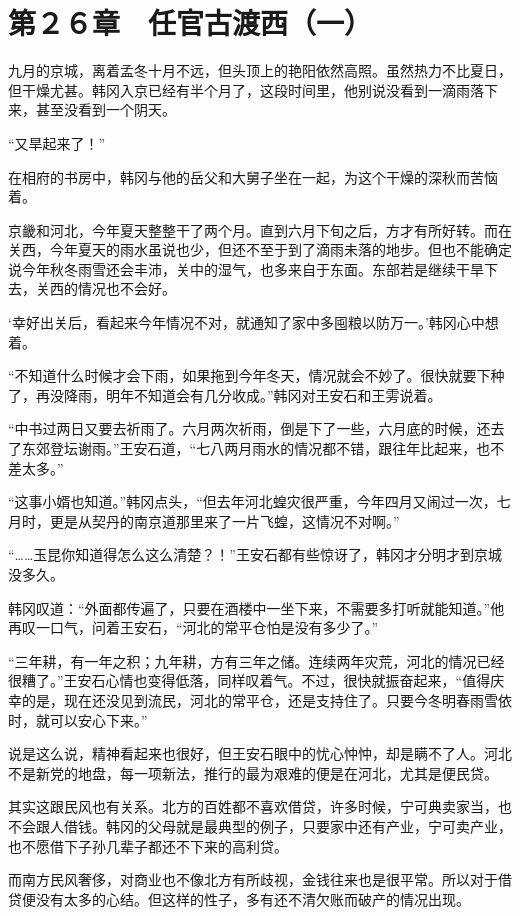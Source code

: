 \section{第２６章　任官古渡西（一）}

九月的京城，离着孟冬十月不远，但头顶上的艳阳依然高照。虽然热力不比夏日，但干燥尤甚。韩冈入京已经有半个月了，这段时间里，他别说没看到一滴雨落下来，甚至没看到一个阴天。

“又旱起来了！”

在相府的书房中，韩冈与他的岳父和大舅子坐在一起，为这个干燥的深秋而苦恼着。

京畿和河北，今年夏天整整干了两个月。直到六月下旬之后，方才有所好转。而在关西，今年夏天的雨水虽说也少，但还不至于到了滴雨未落的地步。但也不能确定说今年秋冬雨雪还会丰沛，关中的湿气，也多来自于东面。东部若是继续干旱下去，关西的情况也不会好。

‘幸好出关后，看起来今年情况不对，就通知了家中多囤粮以防万一。’韩冈心中想着。

“不知道什么时候才会下雨，如果拖到今年冬天，情况就会不妙了。很快就要下种了，再没降雨，明年不知道会有几分收成。”韩冈对王安石和王雱说着。

“中书过两日又要去祈雨了。六月两次祈雨，倒是下了一些，六月底的时候，还去了东郊登坛谢雨。”王安石道，“七八两月雨水的情况都不错，跟往年比起来，也不差太多。”

“这事小婿也知道。”韩冈点头，“但去年河北蝗灾很严重，今年四月又闹过一次，七月时，更是从契丹的南京道那里来了一片飞蝗，这情况不对啊。”

“……玉昆你知道得怎么这么清楚？！”王安石都有些惊讶了，韩冈才分明才到京城没多久。

韩冈叹道：“外面都传遍了，只要在酒楼中一坐下来，不需要多打听就能知道。”他再叹一口气，问着王安石，“河北的常平仓怕是没有多少了。”

“三年耕，有一年之积；九年耕，方有三年之储。连续两年灾荒，河北的情况已经很糟了。”王安石心情也变得低落，同样叹着气。不过，很快就振奋起来，“值得庆幸的是，现在还没见到流民，河北的常平仓，还是支持住了。只要今冬明春雨雪依时，就可以安心下来。”

说是这么说，精神看起来也很好，但王安石眼中的忧心忡忡，却是瞒不了人。河北不是新党的地盘，每一项新法，推行的最为艰难的便是在河北，尤其是便民贷。

其实这跟民风也有关系。北方的百姓都不喜欢借贷，许多时候，宁可典卖家当，也不会跟人借钱。韩冈的父母就是最典型的例子，只要家中还有产业，宁可卖产业，也不愿借下子孙几辈子都还不下来的高利贷。

而南方民风奢侈，对商业也不像北方有所歧视，金钱往来也是很平常。所以对于借贷便没有太多的心结。但这样的性子，多有还不清欠账而破产的情况出现。

